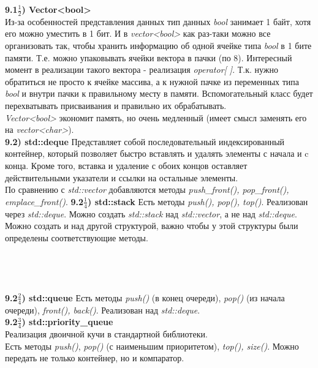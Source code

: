 \documentclass{article}
\begin{document}
\noindent \textbf{9.1$\frac{1}{2}$) Vector<bool>}\\
Из-за особенностей представления данных тип данных \textit{bool} занимает 1 байт, хотя его можно уместить в 1 бит. И в \textit{vector<bool>} как раз-таки можно  все организовать так, чтобы хранить информацию об одной ячейке типа \textit{bool} в 1 бите памяти. Т.е. можно упаковывать ячейки вектора в пачки (по 8).
Интересный момент в реализации такого вектора - реализация \textit{operator[ ]}. Т.к. нужно обратиться не просто к ячейке массива, а к нужной пачке из переменных типа \textit{bool} и внутри пачки к правильному месту в памяти. Вспомогательный класс будет перехватывать присваивания и правильно их обрабатывать.\\
\textit{Vector<bool>} экономит память, но очень медленный (имеет смысл заменять его на \textit{vector<char>}).\\
\noindent \textbf{9.2) std::deque}
Представляет собой последовательный индексированный контейнер, который позволяет быстро вставлять и удалять элементы с начала и c конца. Кроме того, вставка и удаление с обоих концов оставляет действительными указатели и ссылки на остальные элементы.\\
По сравнению с \textit{std::vector} добавляются методы \textit{push\_front(), pop\_front(), emplace\_front()}.
\noindent \textbf{9.2$\frac{1}{4}$) std::stack}
Есть методы \textit{push(), pop(), top()}.
Реализован через \textit{std::deque}.
Можно создать \textit{std::stack} над \textit{std::vector}, а не над \textit{std::deque}. Можно создать и над другой структурой, важно чтобы у этой структуры были определены соответствующие методы.\\\\\\\\
\noindent \\ \textbf{9.2$\frac{2}{4}$) std::queue}
Есть методы \textit{push()} (в конец очереди), \textit{pop()} (из начала очереди), \textit{front(), back()}.
Реализован над \textit{std::deque}.
\noindent \\ \textbf{9.2$\frac{3}{4}$) std::priority\_queue}\\
Реализация двоичной кучи в стандартной библиотеки.\\
Есть методы \textit{push()}, \textit{pop()} (с наименьшим приоритетом), \textit{top(), size()}.
Можно передать не только контейнер, но и компаратор.\\
\end{document}
